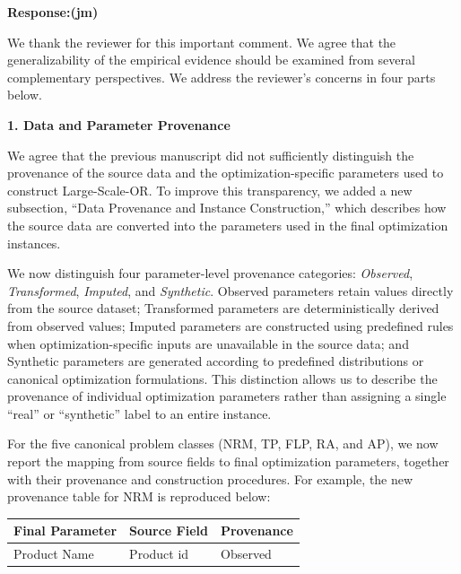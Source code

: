 \documentclass[11pt]{article}
\begin{document}
\begin{enumerate}[label=(AssoE.\arabic*),leftmargin=*]
\begin{enumerate}[label=(R1.Major.\arabic*),leftmargin=*]
\noindent\textbf{Response:(jm)}

We thank the reviewer for this important comment. We agree that the generalizability of the empirical evidence should be examined from several complementary perspectives. We address the reviewer's concerns in four
parts below.

\vspace{2mm}
\noindent\textbf{1. Data and Parameter Provenance}


We agree that the previous manuscript did not sufficiently distinguish the
provenance of the source data and the optimization-specific parameters used
to construct Large-Scale-OR. To improve this transparency, we added a new
subsection, ``Data Provenance and Instance Construction,'' which describes
how the source data are converted into the parameters used in the final
optimization instances.

We now distinguish four parameter-level provenance categories:
\textit{Observed}, \textit{Transformed}, \textit{Imputed}, and
\textit{Synthetic}. Observed parameters retain values directly from the
source dataset; Transformed parameters are deterministically derived from
observed values; Imputed parameters are constructed using predefined rules
when optimization-specific inputs are unavailable in the source data; and
Synthetic parameters are generated according to predefined distributions or
canonical optimization formulations. This distinction allows us to describe
the provenance of individual optimization parameters rather than assigning a
single ``real'' or ``synthetic'' label to an entire instance.

For the five canonical problem classes (NRM, TP, FLP, RA, and AP), we now
report the mapping from source fields to final optimization parameters,
together with their provenance and construction procedures. For example, the
new provenance table for NRM is reproduced below:

\begin{center}
\small
\setlength{\tabcolsep}{6pt}
\renewcommand{\arraystretch}{1.12}
\begin{tabular}{lll}
\hline
\textbf{Final Parameter}
& \textbf{Source Field}
& \textbf{Provenance} \\
\hline
Product Name
& Product id
& Observed \\


\end{tabular}
\end{center}
\end{enumerate}
\end{enumerate}
\end{document}
